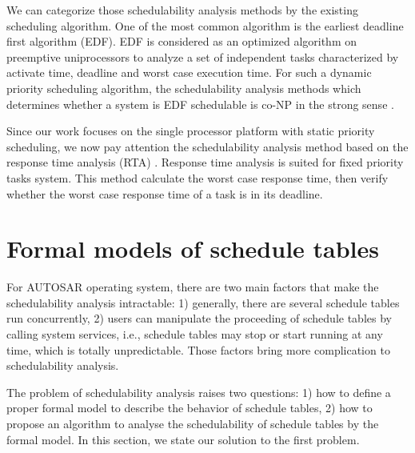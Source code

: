 \documentclass[sigconf]{acmart}
\begin{document}
We can categorize those schedulability analysis methods by the existing scheduling algorithm. One of the most common algorithm is the earliest deadline first algorithm (EDF). EDF is considered as an optimized algorithm on preemptive uniprocessors to analyze a set of independent tasks characterized by activate time, deadline and worst case execution time. For such a dynamic priority scheduling algorithm, the schedulability analysis methods which determines whether a system is EDF schedulable is co-NP in the strong sense \cite{Goossens:1999:LWC:553897}.

Since our work focuses on the single processor platform with static priority scheduling, we now pay attention the schedulability analysis method based on the response time analysis (RTA) \cite{DBLP:journals/iee/AudsleyBRTW93}. Response time analysis is suited for fixed priority tasks system. This method calculate the worst case response time, then verify whether the worst case response time of a task is in its deadline. 

\section{Formal models of schedule tables} 
For AUTOSAR operating system, there are two main factors that make the schedulability analysis intractable: 1) generally, there are several schedule tables run concurrently, 2) users can manipulate the proceeding of schedule tables by calling system services, i.e., schedule tables may stop or start running at any time, which is totally unpredictable. Those factors bring more complication to schedulability analysis. 

The problem of schedulability analysis raises two questions: 1) how to define a proper formal model to describe the behavior of schedule tables, 2) how to propose an algorithm to analyse the schedulability of schedule tables by the formal model. In this section, we state our solution to the first problem. 
\end{document}
